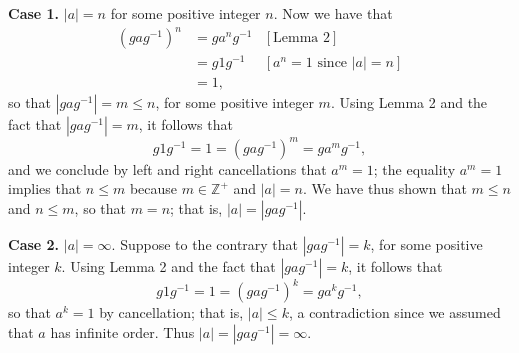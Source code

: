 \documentclass[9pt]{article}
\newcommand{\Z}{\mathbb{Z}}
\begin{document}
\begin{enumerate}
\begin{enumerate}
            \textbf{Case 1.} $|a| = n$ for some positive integer $n$. Now we 
            have that
            \begin{align*}
               (gag^{-1})^n &= ga^ng^{-1} &[\text{Lemma 2}] \\
                  &= g1g^{-1} &[a^n = 1 \text{ since }|a| = n] \\
                  &= 1,
            \end{align*}
            so that $|gag^{-1}| = m \le n$, for some positive integer $m$. Using
            Lemma 2 and the fact that $|gag^{-1}| = m$, it follows that
            $$g1g^{-1} = 1 = (gag^{-1})^m = ga^mg^{-1},$$
            and we conclude by left and right cancellations that $a^m = 1$; the
            equality $a^m = 1$ implies that $n \le m$ because $m \in \Z^+$ and
            $|a| = n$. We have thus shown that $m \le n$ and $n \le m$, so that
            $m = n$; that is, $|a| = |gag^{-1}|$.

            \textbf{Case 2.} $|a| = \infty$. Suppose to the contrary that
            $|gag^{-1}| = k$, for some positive integer $k$. Using Lemma 2 and
            the fact that $|gag^{-1}| = k$, it follows that
            $$g1g^{-1} = 1 = (gag^{-1})^k = ga^kg^{-1},$$
            so that $a^k = 1$ by cancellation; that is, $|a| \le k$, a
            contradiction since we assumed that $a$ has infinite order. Thus
            $|a| = |gag^{-1}| = \infty$. \\


\end{enumerate}
\end{enumerate}
\end{document}
